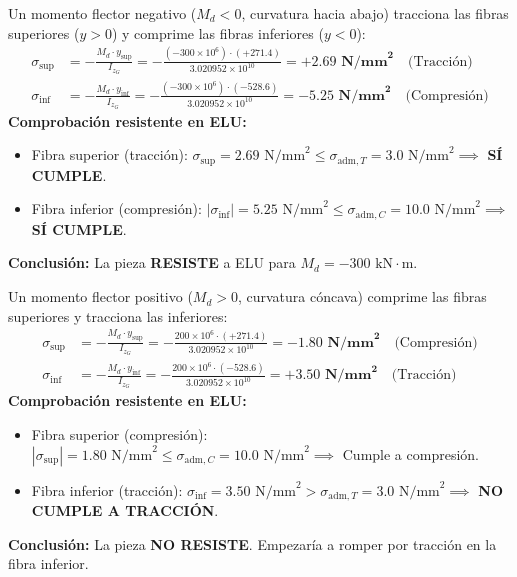 {    

    Un momento flector negativo ($M_d < 0$, curvatura hacia abajo) tracciona las fibras superiores ($y > 0$) y comprime las fibras inferiores ($y < 0$):
    \begin{align}
        \sigma_{\text{sup}} & = -\frac{M_d \cdot y_{\text{sup}}}{I_{z_G}} = -\frac{(-300 \times 10^6) \cdot (+271.4)}{3.020952 \times 10^{10}} = \mathbf{+2.69\text{ N/mm}^2} \quad \text{(Tracción)}    \\
        \sigma_{\text{inf}} & = -\frac{M_d \cdot y_{\text{inf}}}{I_{z_G}} = -\frac{(-300 \times 10^6) \cdot (-528.6)}{3.020952 \times 10^{10}} = \mathbf{-5.25\text{ N/mm}^2} \quad \text{(Compresión)}
    \end{align}
    \textbf{Comprobación resistente en ELU:}
    \begin{itemize}
        \item Fibra superior (tracción): $\sigma_{\text{sup}} = 2.69\text{ N/mm}^2 \le \sigma_{\text{adm},T} = 3.0\text{ N/mm}^2 \implies$ \textbf{SÍ CUMPLE}.
        \item Fibra inferior (compresión): $|\sigma_{\text{inf}}| = 5.25\text{ N/mm}^2 \le \sigma_{\text{adm},C} = 10.0\text{ N/mm}^2 \implies$ \textbf{SÍ CUMPLE}.
    \end{itemize}
    \textbf{Conclusión:} La pieza \textbf{RESISTE} a ELU para $M_d = -300\text{ kN}\cdot\text{m}$.


    Un momento flector positivo ($M_d > 0$, curvatura cóncava) comprime las fibras superiores y tracciona las inferiores:
    \begin{align}
        \sigma_{\text{sup}} & = -\frac{M_d \cdot y_{\text{sup}}}{I_{z_G}} = -\frac{200 \times 10^6 \cdot (+271.4)}{3.020952 \times 10^{10}} = \mathbf{-1.80\text{ N/mm}^2} \quad \text{(Compresión)}   \\
        \sigma_{\text{inf}} & = -\frac{M_d \cdot y_{\text{inf}}}{I_{z_G}} = -\frac{200 \times 10^6 \cdot (-528.6)}{3.020952 \times 10^{10}} = \mathbf{+3.50\text{ N/mm}^2} \quad \text{(Tracción)}
    \end{align}
    \textbf{Comprobación resistente en ELU:}
    \begin{itemize}
        \item Fibra superior (compresión): $|\sigma_{\text{sup}}| = 1.80\text{ N/mm}^2 \le \sigma_{\text{adm},C} = 10.0\text{ N/mm}^2 \implies$ Cumple a compresión.
        \item Fibra inferior (tracción): $\sigma_{\text{inf}} = 3.50\text{ N/mm}^2 > \sigma_{\text{adm},T} = 3.0\text{ N/mm}^2 \implies$ \textbf{NO CUMPLE A TRACCIÓN}.
    \end{itemize}
    \textbf{Conclusión:} La pieza \textbf{NO RESISTE}. Empezaría a romper por tracción en la fibra inferior.

}
